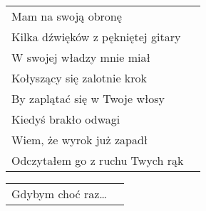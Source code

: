 \documentclass[a5paper]{article}
\begin{document}
\noindent
\begin{tabular}{@{}p{7.50cm}p{3cm}@{}}
Mam na swoją obronę \\
Kilka dźwięków z pękniętej gitary\\
W swojej władzy mnie miał\\
Kołyszący się zalotnie krok\\
By zaplątać się w Twoje włosy\\
Kiedyś brakło odwagi\\
Wiem, że wyrok już zapadł\\
Odczytałem go z ruchu Twych rąk\\
\end{tabular}

\noindent
\begin{tabular}{@{}p{7.50cm}p{3cm}@{}}
Gdybym choć raz…
\end{tabular}
\end{document}
